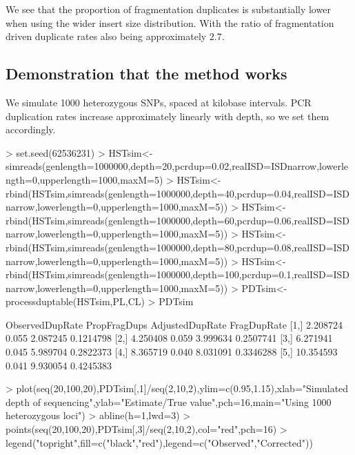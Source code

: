 \documentclass{article}
\begin{document}
We see that the proportion of fragmentation duplicates is substantially lower when using the wider insert size distribution. With the ratio of fragmentation driven duplicate rates also being approximately $2.7$.

\subsection{Demonstration that the method works}

We simulate 1000 heterozygous SNPs, spaced at kilobase intervals. {PCR} duplication rates increase approximately linearly with depth, so we set them accordingly. 

\begin{Schunk}
\begin{Sinput}
> set.seed(62536231)
> HSTsim<-simreads(genlength=1000000,depth=20,pcrdup=0.02,realISD=ISDnarrow,lowerlength=0,upperlength=1000,maxM=5)
> HSTsim<-rbind(HSTsim,simreads(genlength=1000000,depth=40,pcrdup=0.04,realISD=ISDnarrow,lowerlength=0,upperlength=1000,maxM=5))
> HSTsim<-rbind(HSTsim,simreads(genlength=1000000,depth=60,pcrdup=0.06,realISD=ISDnarrow,lowerlength=0,upperlength=1000,maxM=5))
> HSTsim<-rbind(HSTsim,simreads(genlength=1000000,depth=80,pcrdup=0.08,realISD=ISDnarrow,lowerlength=0,upperlength=1000,maxM=5))
> HSTsim<-rbind(HSTsim,simreads(genlength=1000000,depth=100,pcrdup=0.1,realISD=ISDnarrow,lowerlength=0,upperlength=1000,maxM=5))
> PDTsim<-processduptable(HSTsim,PL,CL)
> PDTsim
\end{Sinput}
\begin{Soutput}
     ObservedDupRate PropFragDups AdjustedDupRate FragDupRate
[1,]        2.208724        0.055        2.087245   0.1214798
[2,]        4.250408        0.059        3.999634   0.2507741
[3,]        6.271941        0.045        5.989704   0.2822373
[4,]        8.365719        0.040        8.031091   0.3346288
[5,]       10.354593        0.041        9.930054   0.4245383
\end{Soutput}
\end{Schunk}

\begin{Schunk}
\begin{Sinput}
> plot(seq(20,100,20),PDTsim[,1]/seq(2,10,2),ylim=c(0.95,1.15),xlab="Simulated depth of sequencing",ylab="Estimate/True value",pch=16,main="Using 1000 heterozygous loci")
> abline(h=1,lwd=3)
> points(seq(20,100,20),PDTsim[,3]/seq(2,10,2),col="red",pch=16)
> legend("topright",fill=c("black","red"),legend=c("Observed","Corrected"))
\end{Sinput}
\end{Schunk}
\end{document}
